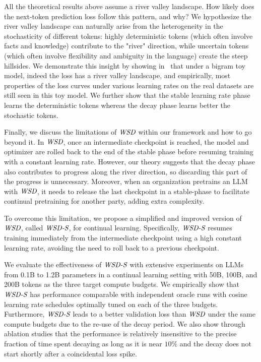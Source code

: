 All the theoretical results above assume a river valley landscape. How likely does the next-token prediction loss follow this pattern, and why?
We hypothesize the river valley landscape can naturally arise from the heterogeneity in the stochasticity of different tokens: highly deterministic tokens (which often involve facts and knowledge) contribute to the "river" direction, while uncertain tokens (which often involve flexibility and ambiguity in the language) create the steep hillsides. We demonstrate this insight by showing in~ that under a bigram toy model, indeed the loss has a river valley landscape, and empirically, most properties of the loss curves under various learning rates on the real datasets are still seen in this toy model. We further show that the stable learning rate phase learns the deterministic tokens whereas the decay phase learns better the stochastic tokens. 





Finally, we discuss the limitations of $\textit{WSD}$ within our framework and how to go beyond it. In $\textit{WSD}$, once an intermediate checkpoint is reached, the model and optimizer are rolled back to the end of the stable phase before resuming training with a constant learning rate. However, our theory suggests that the decay phase also contributes to progress along the river direction, so discarding this part of the progress is unnecessary. Moreover, when an organization pretrains an LLM with $\textit{WSD}$, it needs to release the last checkpoint in a stable-phase to facilitate continual pretraining for another party, adding extra complexity.

To overcome this limitation, we propose a simplified and improved version of $\textit{WSD}$, called \textbf{$\textit{WSD-S}$}, for continual learning. Specifically, $\textit{WSD-S}$ resumes training immediately from the intermediate checkpoint using a high constant learning rate, avoiding the need to roll back to a previous checkpoint.

We evaluate the effectiveness of $\textit{WSD-S}$ with extensive experiments on LLMs from 0.1B to 1.2B parameters in a continual learning setting with 50B, 100B, and 200B tokens as the three target compute budgets. We empirically show that $\textit{WSD-S}$ has performance comparable with independent oracle runs with cosine learning rate schedules optimally tuned on each of the three budgets. Furthermore, $\textit{WSD-S}$ leads to a better validation loss than $\textit{WSD}$ under the same compute budgets due to the re-use of the decay period. We also show through ablation studies that the performance is relatively insensitive to the precise fraction of time spent decaying as long as it is near $10\%$ and the decay does not start shortly after a coincidental loss spike.
